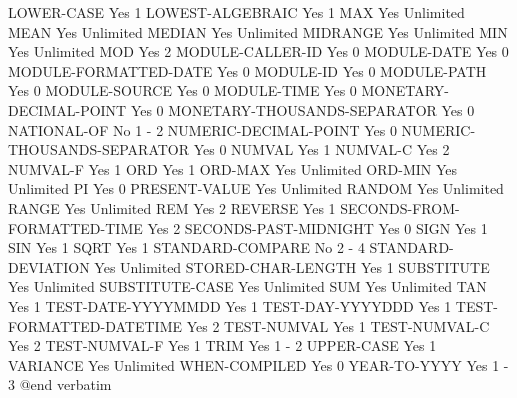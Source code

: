 LOWER-CASE                      Yes             1
LOWEST-ALGEBRAIC                Yes             1
MAX                             Yes             Unlimited
MEAN                            Yes             Unlimited
MEDIAN                          Yes             Unlimited
MIDRANGE                        Yes             Unlimited
MIN                             Yes             Unlimited
MOD                             Yes             2
MODULE-CALLER-ID                Yes             0
MODULE-DATE                     Yes             0
MODULE-FORMATTED-DATE           Yes             0
MODULE-ID                       Yes             0
MODULE-PATH                     Yes             0
MODULE-SOURCE                   Yes             0
MODULE-TIME                     Yes             0
MONETARY-DECIMAL-POINT          Yes             0
MONETARY-THOUSANDS-SEPARATOR    Yes             0
NATIONAL-OF                     No              1 - 2
NUMERIC-DECIMAL-POINT           Yes             0
NUMERIC-THOUSANDS-SEPARATOR     Yes             0
NUMVAL                          Yes             1
NUMVAL-C                        Yes             2
NUMVAL-F                        Yes             1
ORD                             Yes             1
ORD-MAX                         Yes             Unlimited
ORD-MIN                         Yes             Unlimited
PI                              Yes             0
PRESENT-VALUE                   Yes             Unlimited
RANDOM                          Yes             Unlimited
RANGE                           Yes             Unlimited
REM                             Yes             2
REVERSE                         Yes             1
SECONDS-FROM-FORMATTED-TIME     Yes             2
SECONDS-PAST-MIDNIGHT           Yes             0
SIGN                            Yes             1
SIN                             Yes             1
SQRT                            Yes             1
STANDARD-COMPARE                No              2 - 4
STANDARD-DEVIATION              Yes             Unlimited
STORED-CHAR-LENGTH              Yes             1
SUBSTITUTE                      Yes             Unlimited
SUBSTITUTE-CASE                 Yes             Unlimited
SUM                             Yes             Unlimited
TAN                             Yes             1
TEST-DATE-YYYYMMDD              Yes             1
TEST-DAY-YYYYDDD                Yes             1
TEST-FORMATTED-DATETIME         Yes             2
TEST-NUMVAL                     Yes             1
TEST-NUMVAL-C                   Yes             2
TEST-NUMVAL-F                   Yes             1
TRIM                            Yes             1 - 2
UPPER-CASE                      Yes             1
VARIANCE                        Yes             Unlimited
WHEN-COMPILED                   Yes             0
YEAR-TO-YYYY                    Yes             1 - 3
@end verbatim

